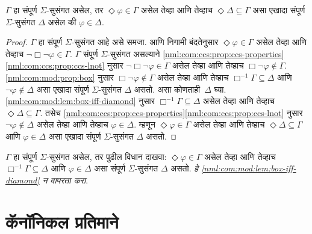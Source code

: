 \begin{prop}\label{nml:com:mod:prop:diamond}
  $\Gamma$ हा संपूर्ण $\Sigma$-सुसंगत
  असेल, तर $\Diamond \varphi \in \Gamma$
  असेल तेव्हा आणि तेव्हाच
  $\Diamond\Delta \subseteq
  \Gamma$ असा एखादा संपूर्ण
  $\Sigma$-सुसंगत $\Delta$
  असेल की $\varphi \in \Delta$.
\end{prop}

\begin{proof}
$\Gamma$ हा संपूर्ण $\Sigma$-सुसंगत
आहे असे समजा. \Dual{} आणि निगामी बंदतेनुसार
$\Diamond\varphi \in \Gamma$ असेल तेव्हा
आणि तेव्हाच $\lnot\Box\lnot \varphi \in
\Gamma$. $\Gamma$ संपूर्ण
$\Sigma$-सुसंगत असल्याने
\ref{nml:com:ccs:prop:ccs-properties}\ref{nml:com:ccs:prop:ccs-lnot}
नुसार $\lnot\Box\lnot \varphi \in \Gamma$
असेल तेव्हा आणि तेव्हाच
$\Box\lnot \varphi \notin \Gamma$.
\ref{nml:com:mod:prop:box} नुसार
$\Box\lnot \varphi \notin \Gamma$
असेल तेव्हा आणि तेव्हाच
$\Box^{-1}\Gamma \subseteq \Delta$
आणि $\lnot\varphi \notin \Delta$
असा एखादा संपूर्ण $\Sigma$-सुसंगत
$\Delta$ असतो. असा कोणताही~$\Delta$
घ्या. \ref{nml:com:mod:lem:box-iff-diamond}
नुसार $\Box^{-1}\Gamma \subseteq \Delta$
असेल तेव्हा आणि तेव्हाच
$\Diamond\Delta \subseteq \Gamma$.
तसेच
\ref{nml:com:ccs:prop:ccs-properties}\ref{nml:com:ccs:prop:ccs-lnot}
नुसार $\lnot \varphi \notin \Delta$
असेल तेव्हा आणि तेव्हाच
$\varphi \in \Delta$. म्हणून
$\Diamond\varphi \in \Gamma$
असेल तेव्हा आणि तेव्हाच
$\Diamond\Delta \subseteq \Gamma$
आणि $\varphi \in \Delta$ असा एखादा
संपूर्ण $\Sigma$-सुसंगत $\Delta$
असतो.
\end{proof}



\begin{prob}
  $\Gamma$ हा संपूर्ण $\Sigma$-सुसंगत
  असेल, तर पुढील विधान दाखवा:
  $\Diamond \varphi \in \Gamma$
    असेल तेव्हा आणि तेव्हाच
    $\Box^{-1}\Gamma \subseteq \Delta$
    आणि $\varphi \in \Delta$ असा संपूर्ण
    $\Sigma$-सुसंगत $\Delta$ असतो.
  \emph{हे
    \ref{nml:com:mod:lem:box-iff-diamond}
    न वापरता करा}.
\end{prob}













\section{कॅनॉनिकल प्रतिमाने}\label{nml:com:cmd:sec}


